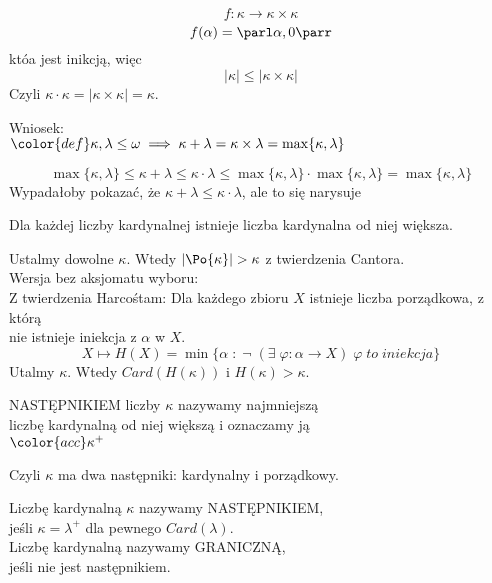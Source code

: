 $$f:\kappa\to\kappa\times\kappa$$
$$f(\alpha)=\parl\alpha,0\parr$$
któa jest inikcją, więc 
$$|\kappa|\leq|\kappa\times\kappa|$$
Czyli $\kappa\cdot\kappa=|\kappa\times\kappa|=\kappa$.
\kondow
\begin{center}\large
    Wniosek:\smallskip\\
$\color{def}\kappa,\lambda\leq\omega\implies \kappa+\lambda=\kappa\times\lambda=\max\{\kappa,\lambda\}$
\end{center}
\dowod
$$\max\{\kappa,\lambda\}\leq\kappa+\lambda\leq\kappa\cdot\lambda\leq\max\{\kappa,\lambda\}\cdot\max\{\kappa,\lambda\}=\max\{\kappa,\lambda\}$$
Wypadałoby pokazać, że $\kappa+\lambda\leq\kappa\cdot\lambda$, ale to się narysuje\bigskip
\kondow\bigskip
{}\bigskip
\begin{center}\large
    Dla każdej liczby kardynalnej istnieje liczba kardynalna od niej większa.
\end{center}
\dowod
Ustalmy dowolne $\kappa$. Wtedy $|\Po{\kappa}|>\kappa$ z twierdzenia Cantora.\medskip\\
\dowod
Wersja bez aksjomatu wyboru:\medskip\\
Z twierdzenia Harcośtam: Dla każdego zbioru $X$ istnieje liczba porządkowa, z którą \\nie istnieje iniekcja z $\alpha$ w $X$.
$$X\mapsto H(X)=\min\{\alpha\;:\;\neg\;(\exists\;\varphi:\alpha\to X)\;\varphi\; to\; iniekcja\}$$
Utalmy $\kappa$. Wtedy $Card(H(\kappa))$ i $H(\kappa)>\kappa$.
\kondow
\newpage
{}\bigskip
\begin{center}\large
    {\color{def}NASTĘPNIKIEM} liczby $\kappa$ nazywamy najmniejszą \\liczbę kardynalną od niej większą i oznaczamy ją\smallskip\\
    $\color{acc}\kappa^+$
\end{center}
Czyli $\kappa$ ma dwa następniki: kardynalny i porządkowy.\bigskip
\begin{center}\large
    Liczbę kardynalną $\kappa$ nazywamy {\color{def}NASTĘPNIKIEM}, \\jeśli $\kappa=\lambda^+$ dla pewnego $Card(\lambda)$.\medskip\\
    Liczbę kardynalną nazywamy {\color{def}GRANICZNĄ}, \\jeśli nie jest następnikiem.
\end{center}

